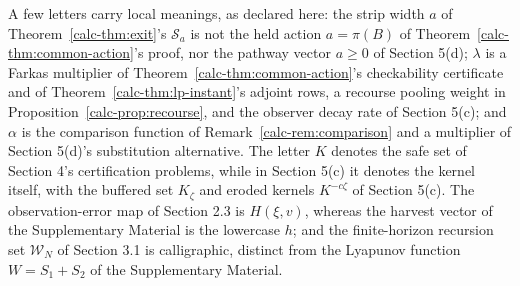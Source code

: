 \documentclass[10pt,twocolumn]{article}
\theoremstyle{definition}
\begin{document}
A few letters carry local meanings, as declared here: the strip width \(a\) of
Theorem~\ref{calc-thm:exit}'s \(\mathcal{S}_a\) is not the held action
\(a = \pi(B)\) of Theorem~\ref{calc-thm:common-action}'s proof, nor the
pathway vector \(a \ge 0\) of Section 5(d); \(\lambda\) is a Farkas
multiplier of Theorem~\ref{calc-thm:common-action}'s checkability
certificate and of Theorem~\ref{calc-thm:lp-instant}'s adjoint rows, a
recourse pooling weight in Proposition~\ref{calc-prop:recourse}, and the
observer decay rate of Section 5(c); and
\(\alpha\) is the comparison function of Remark~\ref{calc-rem:comparison}
and a multiplier of Section 5(d)'s substitution alternative. The
letter \(K\) denotes the safe set of Section 4's certification
problems, while in Section 5(c) it denotes the kernel
itself, with the buffered set \(K_\zeta\) and eroded kernels
\(K^{-c\zeta}\) of Section 5(c). The observation-error map of
Section 2.3 is \(H(\xi, v)\), whereas the harvest vector of
the Supplementary Material is the lowercase \(h\); and the finite-horizon recursion
set \(\mathcal{W}_N\) of Section 3.1 is calligraphic, distinct from
the Lyapunov function \(W = S_1 + S_2\) of the Supplementary Material.
\end{document}
